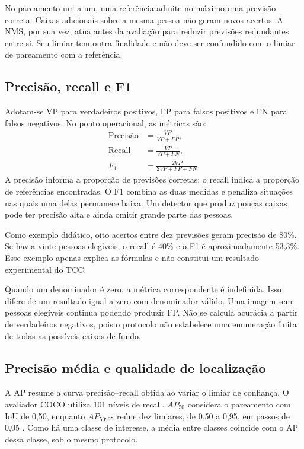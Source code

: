 No pareamento um a um, uma referência admite no máximo uma previsão correta. Caixas adicionais sobre a mesma pessoa não geram novos acertos. A NMS, por sua vez, atua antes da avaliação para reduzir previsões redundantes entre si. Seu limiar tem outra finalidade e não deve ser confundido com o limiar de pareamento com a referência.

\subsection{Precisão, recall e F1}
Adotam-se VP para verdadeiros positivos, FP para falsos positivos e FN para falsos negativos. No ponto operacional, as métricas são:
\begin{align}
\text{Precisão}&=\frac{VP}{VP+FP},\\
\mathrm{Recall}&=\frac{VP}{VP+FN},\\
F_1&=\frac{2VP}{2VP+FP+FN}.
\end{align}
A precisão informa a proporção de previsões corretas; o recall indica a proporção de referências encontradas. O F1 combina as duas medidas e penaliza situações nas quais uma delas permanece baixa. Um detector que produz poucas caixas pode ter precisão alta e ainda omitir grande parte das pessoas.

Como exemplo didático, oito acertos entre dez previsões geram precisão de 80\%. Se havia vinte pessoas elegíveis, o recall é 40\% e o F1 é aproximadamente 53,3\%. Esse exemplo apenas explica as fórmulas e não constitui um resultado experimental do TCC.

Quando um denominador é zero, a métrica correspondente é indefinida. Isso difere de um resultado igual a zero com denominador válido. Uma imagem sem pessoas elegíveis continua podendo produzir FP. Não se calcula acurácia a partir de verdadeiros negativos, pois o protocolo não estabelece uma enumeração finita de todas as possíveis caixas de fundo.

\subsection{Precisão média e qualidade de localização}
A AP resume a curva precisão--recall obtida ao variar o limiar de confiança. O avaliador COCO utiliza 101 níveis de recall. $AP_{50}$ considera o pareamento com IoU de 0,50, enquanto $AP_{50:95}$ reúne dez limiares, de 0,50 a 0,95, em passos de 0,05 \cite{coco_eval}. Como há uma classe de interesse, a média entre classes coincide com o AP dessa classe, sob o mesmo protocolo.

